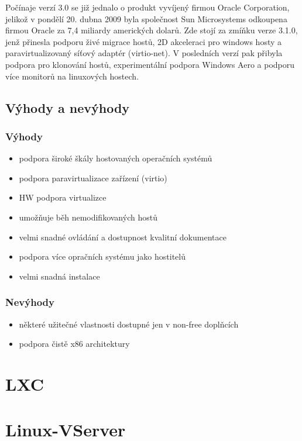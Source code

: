 Počínaje verzí 3.0 se již jednalo o produkt vyvíjený firmou Oracle Corporation, jelikož v pondělí 20. dubna 2009 byla společnost Sun Microsystems odkoupena firmou Oracle za 7,4 miliardy amerických dolarů. Zde stojí za zmíňku verze 3.1.0, jenž přinesla podporu živé migrace hostů, 2D akceleraci pro windows hosty a paravirtualizovaný síťový adaptér (virtio-net). V posledních verzí pak přibyla podpora pro klonování hostů, experimentální podpora Windows Aero a podporu více monitorů na linuxových hostech.

\subsection{Výhody a nevýhody}
\subsubsection{Výhody}
\begin{itemize}
  \item podpora široké škály hostovaných operačních systémů 
  \item podpora paravirtualizace zařízení (virtio)
  \item HW podpora virtualizce
  \item umožňuje běh nemodifikovaných hostů
  \item velmi snadné ovládání a dostupnost kvalitní dokumentace
  \item podpora více opračních systému jako hostitelů
  \item velmi snadná instalace
\end{itemize}
\subsubsection{Nevýhody}
\begin{itemize}
  \item některé užitečné vlastnosti dostupné jen v non-free doplňcích
  \item podpora čistě x86 architektury
\end{itemize}
\section{LXC}
\section{Linux-VServer}
